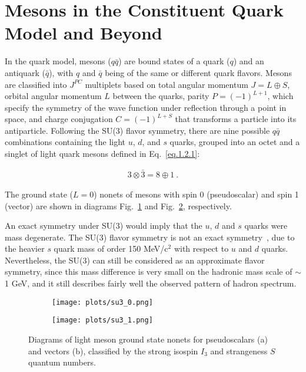 \section{Mesons in the Constituent Quark Model and Beyond}
\label{p.1.2}

In the quark model, mesons ($q\bar{q}$) are bound states of a quark ($q$) and an antiquark ($\bar{q}$), with $q$ and $\bar{q}$ being of the same or different quark flavors. Mesons are classified into $J^{PC}$ multiplets based on  total angular momentum $J = L \oplus S$, orbital angular momentum $L$ between the quarks, parity $P=(-1)^{L+1}$, which specify the symmetry of the wave function under reflection through a point in space, and charge conjugation $C=(-1)^{L+S}$ that transforms a particle into its antiparticle. Following the SU(3) flavor symmetry, there are nine possible $q\bar{q}$ combinations containing the light $u$, $d$, and $s$ quarks, grouped into an octet and a singlet of light quark mesons defined in Eq.~\ref{eq.1.2.1}:

\begin{equation}
    \label{eq.1.2.1}
    \begin{aligned}
        3 \otimes \bar{3} = 8 \oplus 1~.
    \end{aligned}
\end{equation}

The ground state ($L=0$) nonets of mesons with spin 0 (pseudoscalar) and spin 1 (vector) are shown in diagrams Fig.~\ref{fig.1.2.1.a} and Fig.~\ref{fig.1.2.1.b}, respectively.
~\par An exact symmetry under SU(3) would imply that the $u$, $d$ and $s$ quarks were mass degenerate. The SU(3) flavor symmetry is not an exact symmetry~\cite{Zweig64}, due to the heavier $s$ quark mass of order 150 MeV/c$^{2}$ with respect to $u$ and $d$ quarks. Nevertheless, the SU(3) can still be considered as an approximate flavor symmetry, since this mass difference is very small on the hadronic mass scale of $\sim$ 1 GeV, and it still describes fairly well the observed pattern of hadron spectrum.

\begin{figure}[H]
    \centering
    \begin{subfigure}[H]{0.5\textwidth}
        \texttt{[image: plots/su3\_0.png]}
        \caption{}
        \label{fig.1.2.1.a}
    \end{subfigure}\hfill
    \begin{subfigure}[H]{0.5\textwidth}
        \texttt{[image: plots/su3\_1.png]}
        \caption{}
        \label{fig.1.2.1.b}
    \end{subfigure}
    \caption{Diagrams of light meson ground state nonets for pseudoscalars (a) and vectors (b), classified by the strong isospin $I_3$ and strangeness $S$ quantum numbers.}
    \label{fig.1.2.1}
\end{figure}

